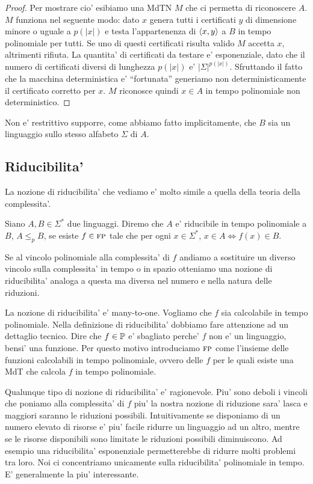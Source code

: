 \begin{proof}
    Per mostrare cio' esibiamo una MdTN $M$ che ci permetta di riconoscere $A$. $M$ funziona nel
    seguente modo: dato $x$ genera tutti i certificati $y$ di dimensione minore o uguale a $p(|x|)$
    e testa l'appartenenza di $\langle x, y \rangle$ a $B$ in tempo polinomiale per tutti. Se uno di questi
    certificati risulta valido $M$ accetta $x$, altrimenti rifiuta. La quantita' di certificati da
    testare e' esponenziale, dato che il numero di certificati diversi di lunghezza $p(|x|)$ e'
    $|\Sigma|^{p(|x|)}$. Sfruttando il fatto che la macchina deterministica e' ``fortunata''
    generiamo non deterministicamente il certificato corretto per $x$. $M$ riconosce quindi $x
    \in A$ in tempo polinomiale non deterministico.

\end{proof}

Non e' restrittivo supporre, come abbiamo fatto implicitamente, che $B$ sia un linguaggio sullo
stesso alfabeto $\Sigma$ di $A$.

\subsection{Riducibilita'}


La nozione di riducibilita' che vediamo e' molto simile a quella della teoria della complessita'.

\begin{defn}
    Siano $A,B \in \Sigma^{*}$ due linguaggi. Diremo che $A$ e' riducibile in tempo polinomiale a
    $B$, $A \leq_{p} B$, se esiste $f \in \textsc{fp}$ tale che per ogni $x \in \Sigma^{*}$, $x \in A \iff
    f(x) \in B$.
\end{defn}
Se al vincolo polinomiale alla complessita' di $f$ andiamo a sostituire un diverso vincolo sulla
complessita' in tempo o in spazio otteniamo una nozione di riducibilita' analoga a questa ma diversa
nel numero e nella natura delle riduzioni.

La nozione di riducibilita' e' many-to-one. Vogliamo che $f$ sia calcolabile in tempo polinomiale.
Nella definizione di riducibilita' dobbiamo fare attenzione ad un dettaglio tecnico.  Dire che $f
\in \mathbb{P}$ e' sbagliato perche' $f$ non e' un linguaggio, bensi' una funzione. Per questo motivo
introduciamo $\textsc{fp}$ come l'insieme delle funzioni calcolabili in tempo polinomiale, ovvero delle $f$
per le quali esiste una MdT che calcola $f$ in tempo polinomiale.

Qualunque tipo di nozione di riducibilita' e' ragionevole. Piu' sono deboli i vincoli che poniamo
alla complessita' di $f$ piu' la nostra nozione di riduzione sara' lasca e maggiori saranno le
riduzioni possibili. Intuitivamente se disponiamo di un numero elevato di risorse e' piu' facile
ridurre un linguaggio ad un altro, mentre se le risorse disponibili sono limitate le riduzioni
possibili diminuiscono. Ad esempio una riducibilita' esponenziale permetterebbe di ridurre molti
problemi tra loro. Noi ci concentriamo unicamente sulla riducibilita' polinomiale in tempo. E'
generalmente la piu' interessante.

